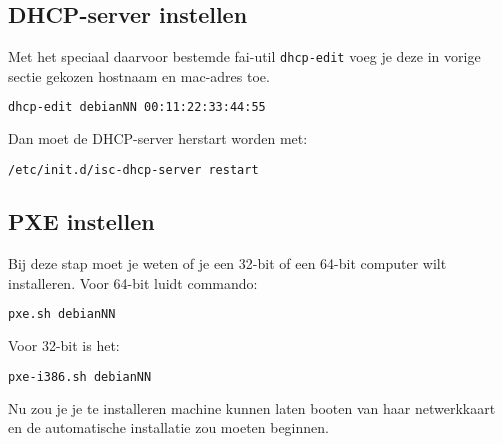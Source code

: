 \documentclass[11pt,a4paper]{article}
\begin{document}
\subsection{DHCP-server instellen}
Met het speciaal daarvoor bestemde fai-util \texttt{dhcp-edit} voeg je deze in vorige sectie gekozen hostnaam en mac-adres toe.
\begin{lstlisting}[language=bash]
dhcp-edit debianNN 00:11:22:33:44:55
\end{lstlisting}
Dan moet de DHCP-server herstart worden met:

\begin{lstlisting}[language=bash]
/etc/init.d/isc-dhcp-server restart
\end{lstlisting}


\subsection{PXE instellen}
Bij deze stap moet je weten of je een 32-bit of een 64-bit computer wilt installeren.
Voor 64-bit luidt commando:
\begin{lstlisting}[language=bash]
pxe.sh debianNN
\end{lstlisting}
Voor 32-bit is het:
\begin{lstlisting}[language=bash]
pxe-i386.sh debianNN
\end{lstlisting}

Nu zou je je te installeren machine kunnen laten booten van haar netwerkkaart en de automatische installatie zou moeten beginnen.
\end{document}
